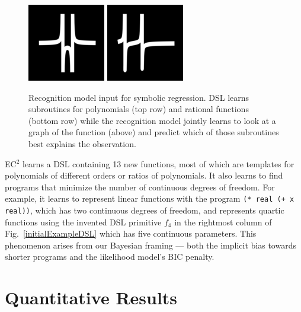 \documentclass{article}
\newcommand{\system}{\textsc{EC$^2$} }
\newcommand{\code}[1]{{\footnotesize\texttt{#1}}}
\begin{document}
\begin{figure}
  \includegraphics[width = \functionSize]{figures/functions/149.png}
    \includegraphics[width = \functionSize]{figures/functions/187.png}
  \caption{Recognition model input for symbolic regression. DSL learns subroutines for polynomials (top row) and rational functions (bottom row) while the recognition  model jointly learns to look at a graph of the function (above) and predict which of those subroutines best explains the observation.}\label{functions}\vspace{-0.5cm}
\end{figure}
\system learns a DSL containing 13 new functions,
most of which are templates for polynomials of different orders or ratios of polynomials.
It also learns to find programs that minimize the number of continuous degrees of freedom.
For example, it learns to represent linear functions with the program
\code{(* real (+ x real))}, which has two continuous degrees of freedom, and represents quartic functions using the invented DSL primitive $f_4$ in the rightmost column of Fig.~\ref{initialExampleDSL}
which has five continuous parameters.
This phenomenon arises from our Bayesian framing --- both the implicit bias towards shorter programs and the likelihood model's BIC penalty.


\section{Quantitative Results}\label{quantitative}
\end{document}
